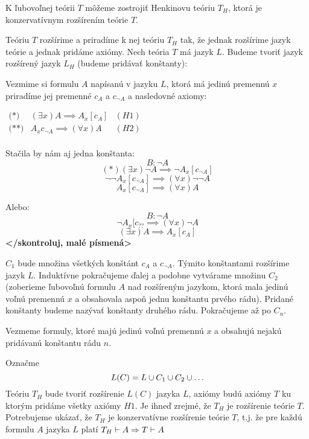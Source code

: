 \begin{veta}[Henkinova] 
    K ľubovoľnej teórii $T$ môžeme zostrojiť Henkinovu
    teóriu $T_H$, ktorá je konzervatívnym rozšírením teórie $T$.
\end{veta}    

\begin{dokaz}
    Teóriu $T$ rozšírime a priradíme k nej teóriu $T_H$ tak, že
    jednak rozšírime jazyk teórie a jednak pridáme axiómy.
    Nech teória $T$ má jazyk $L$.
    Budeme tvoriť jazyk rozšírený jazyk $L_H$ (budeme pridávať konštanty):


    \par Vezmime si formulu $A$ napísanú v jazyku $L$, ktorá má jedinú premennú $x$
    priradíme jej premenné $c_A$ a $c_{\neg A}$ a nasledovné axiomy: 

    $
    \begin{array}{lll}
    \mbox{(*)} & (\exists x) A \implies A_x[c_A] & (H1) \\
    \mbox{(**)} & A_x{c_{\neg A}} \implies (\forall x) A & (H2) \\
    \end{array}
    $

    Stačila by nám aj jedna konštanta:
    $$B: \neg A$$
    $$ (*) (\exists x) \neg A \implies \neg A_x[c_{\neg A}]$$
    $$\neg \neg A_x[c_{\neg A}] \implies (\forall x) \neg \neg A$$
    $$A_x[c_{\neg A}] \implies (\forall x) A$$

    Alebo:
    $$B: \neg A$$
    $$\neg A_x[c_{??} \implies (\forall x) \neg A$$
    $$(\exists x) A \implies A_x[c_A]$$
    \textbf{</skontroluj, malé písmená>}

    \par $C_1$ bude množina všetkých konštánt $c_A$ a $c_{\neg A}$. Týmito konštantami
    rozšírime jazyk $L$. Induktívne pokračujeme ďalej a podobne vytvárame množinu $C_2$
    (zoberieme ľubovoľnú formulu $A$ nad rozšíreným jazykom, ktorá mala jedinú voľnú
    premennú $x$ a obsahovala aspoň jednu konštantu prvého rádu).
    Pridané konštanty budeme nazývať konštanty druhého rádu. Pokračujeme až po
    $C_n$.

    \par Vezmeme formuly, ktoré majú jedinú voľnú premennú $x$ a obsahujú nejakú
    pridávanú konštantu rádu $n$.

    Označme
    \begin{equation*}
        L(C) = L \cup C_1 \cup C_2 \cup \ldots
    \end{equation*}
    Teóriu $T_H$ bude tvoriť rozšírenie $L(C)$ jazyka $L$, axiómy budú axiómy $T$
    ku ktorým pridáme všetky axiómy $H1$.
    Je ihneď zrejmé, že $T_H$ je rozšírenie teórie $T$.
    Potrebujeme ukázať, že $T_H$ je konzervatívne rozšírenie teórie $T$, t.j.
    že pre každú formulu $A$ jazyka $L$ platí 
    $T_H \vdash A \Rightarrow T \vdash A$


\end{dokaz}
